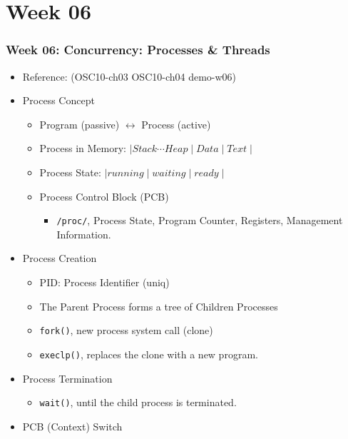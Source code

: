 \documentclass[aspectratio=169, xcolor=table, notheorems, hyperref={pdfpagelabels=false}]{beamer}
\begin{document}
\section{Week 06}
\begin{frame}[fragile]
\frametitle{Week 06: Concurrency: Processes \& Threads}
\begin{itemize}
\item Reference: (OSC10-ch03 OSC10-ch04 demo-w06)
\item Process Concept
\begin{itemize}
\item Program (passive) $\leftrightarrow$ Process (active)
\item Process in Memory: $ \mid Stack \cdots Heap \mid Data \mid Text \mid $
\item Process State: $ \mid running \mid waiting \mid ready \mid $
\item Process Control Block (PCB)
\begin{itemize}
\item \texttt{/proc/}, Process State, Program Counter, Registers, Management Information.
\end{itemize}
\end{itemize}
\item Process Creation
\begin{itemize}
\item PID: Process Identifier (uniq)
\item The Parent Process forms a tree of Children Processes
\item \texttt{fork()}, new process system call (clone)
\item \texttt{execlp()}, replaces the clone with a new program.
\end{itemize}
\item Process Termination
\begin{itemize}
\item \texttt{wait()}, until the child process is terminated.
\end{itemize}
\item PCB (Context) Switch
\end{itemize}
\end{frame}

\end{document}
